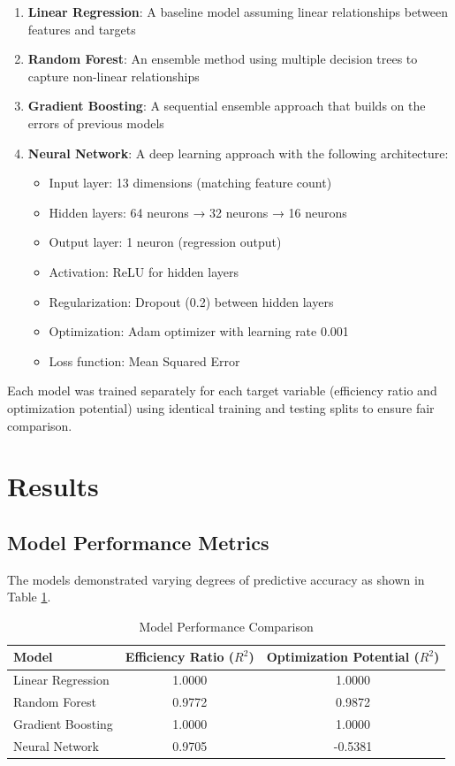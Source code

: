 \documentclass[12pt,a4paper]{article}
\begin{document}
\begin{enumerate}
    \item \textbf{Linear Regression}: A baseline model assuming linear relationships between features and targets
    \item \textbf{Random Forest}: An ensemble method using multiple decision trees to capture non-linear relationships
    \item \textbf{Gradient Boosting}: A sequential ensemble approach that builds on the errors of previous models
    \item \textbf{Neural Network}: A deep learning approach with the following architecture:
    \begin{itemize}
        \item Input layer: 13 dimensions (matching feature count)
        \item Hidden layers: 64 neurons → 32 neurons → 16 neurons
        \item Output layer: 1 neuron (regression output)
        \item Activation: ReLU for hidden layers
        \item Regularization: Dropout (0.2) between hidden layers
        \item Optimization: Adam optimizer with learning rate 0.001
        \item Loss function: Mean Squared Error
    \end{itemize}
\end{enumerate}

Each model was trained separately for each target variable (efficiency ratio and optimization potential) using identical training and testing splits to ensure fair comparison.

\section{Results}

\subsection{Model Performance Metrics}

The models demonstrated varying degrees of predictive accuracy as shown in Table \ref{tab:model-performance}.

\begin{table}[htbp]
\centering
\caption{Model Performance Comparison}
\label{tab:model-performance}
\begin{tabular}{lcc}
\toprule
\textbf{Model} & \textbf{Efficiency Ratio ($R^2$)} & \textbf{Optimization Potential ($R^2$)} \\
\midrule
Linear Regression & 1.0000 & 1.0000 \\
Random Forest & 0.9772 & 0.9872 \\
Gradient Boosting & 1.0000 & 1.0000 \\
Neural Network & 0.9705 & -0.5381 \\
\bottomrule
\end{tabular}
\end{table}
\end{document}
